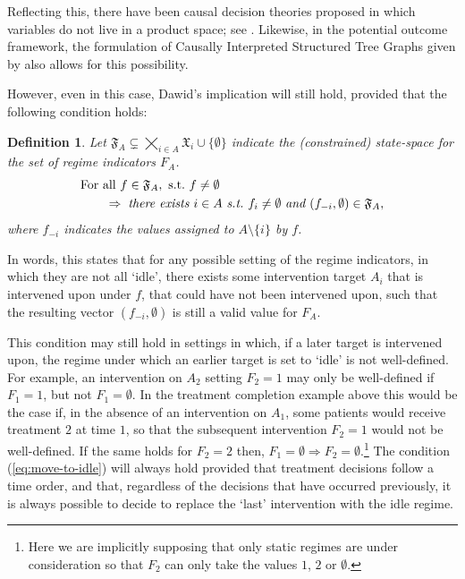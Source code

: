 \documentclass[11pt]{article}
\newtheorem{definition}[theorem]{Definition}
\begin{document}
{Reflecting this, there have been causal decision theories proposed in which variables do not live in a product space; see \citet{THWAITES2010889}. 
Likewise, in the potential outcome framework, the formulation of Causally Interpreted Structured Tree Graphs given by \citet{robins86new} also allows for this possibility.

However, even in this case, Dawid's implication will still hold, provided that the following condition holds:

\begin{definition}
Let $\mathfrak{F}_A \subsetneq \bigtimes_{i \in A} \mathfrak{X}_{i}\cup\{\emptyset\}$ indicate the (constrained) state-space for the set of regime indicators $F_A$. 
\begin{align}
\MoveEqLeft{\hbox{For all } f \in \mathfrak{F}_A, \hbox{ s.t.~}f\neq \emptyset\;}\\
& \Rightarrow\; \nonumber
\hbox{\it there exists } i\in A \hbox{ \it s.t.~} f_i \neq \emptyset \hbox{ \it and } (f_{-i}, \emptyset) \in \mathfrak{F}_A,\label{eq:move-to-idle}
\end{align}
where $f_{-i}$ indicates the values assigned to $A\setminus \{i\}$ by $f$.
\end{definition}
In words, this states that for any possible setting of the regime indicators, in which they are not all `idle', there exists some intervention target $A_i$ that is intervened upon under $f$, that could have not been intervened upon, such that the resulting vector $(f_{-i}, \emptyset)$ is still a valid value for $F_A$.

This condition may still hold in settings in which, if a later target is intervened upon, the regime under which an earlier target is set to `idle' is not well-defined. For example, an intervention on $A_2$ setting $F_2=1$ may only be well-defined if $F_1=1$, but not $F_1=\emptyset$.
In the treatment completion example above this would be the case 
if, in the absence of an intervention on $A_1$, some patients would receive treatment $2$ at time $1$, so that the subsequent intervention $F_2=1$ would not be well-defined. If the same holds for $F_2=2$ then, $F_1=\emptyset \Rightarrow F_2=\emptyset$.\footnote{Here we are implicitly supposing that only static regimes are under consideration so that $F_2$ can only take the values $1$, $2$ or $\emptyset$.}
 The condition (\ref{eq:move-to-idle}) will always hold provided that treatment decisions follow a time order, and that, regardless of the decisions that have occurred previously, it is always possible to decide to replace the `last' intervention with the idle regime.


}
\end{document}
